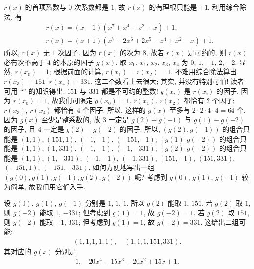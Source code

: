 \begin{example}
    $r(x)$ 的首项系数与 $0$ 次系数都是 $1$, 故 $r(x)$ 的有理根只能是 $\pm 1$. 利用综合除法, 有
    \begin{align*}
         & r(x) = (x-1) (x^7+x^4+x^2+x) + 1,             \\
         & r(x) = (x+1) (x^7-2 x^6+2 x^5-x^4+x^2-x) + 1.
    \end{align*}
    所以, $r(x)$ 无 $1$ 次因子. 因为 $r(x)$ 的次为 $8$, 故若 $r(x)$ 是可约的, 则 $r(x)$ 必有次不高于 $4$ 的本原的因子 $g(x)$. 取 $x_0$, $x_1$, $x_2$, $x_3$, $x_4$ 为 $0$, $1$, $-1$, $2$, $-2$. 显然, $r(x_0) = 1$; 根据前面的计算, $r(x_1) = r(x_2) = 1$. 不难用综合除法算出 $r(x_3) = 151$, $r(x_4) = 331$. 这二个数看上去很大; 其实, 并没有特别可怕! 读者可用 ``\FactorizationOfIntegers '' 的知识得出: $151$ 与 $331$ 都是不可约的整数! $g(x_i)$ 是 $r(x_i)$ 的因子. 因为 $r(x_0) = 1$, 故我们可限定 $g(x_0) = 1$. $r(x_1)$, $r(x_2)$ 都恰有 $2$ 个因子; $r(x_3)$, $r(x_4)$ 都恰有 $4$ 个因子. 所以, 这样的 $g(x)$ 至多有 $2 \cdot 2 \cdot 4 \cdot 4 = 64$ 个. 因为 $g(x)$ 至少是整系数的, 故 $3$ 一定是 $g(2) - g(-1)$ 与 $g(1) - g(-2)$ 的因子, 且 $4$ 一定是 $g(2) - g(-2)$ 的因子. 所以, $(g(2), g(-1))$ 的组合只能是 $(1, 1)$, $(151, 1)$, $(-1, -1)$, $(-151, -1)$; $(g(1), g(-2))$ 的组合只能是 $(1, 1)$, $(1, 331)$, $(-1, -1)$, $(-1, -331)$; $(g(2), g(-2))$ 的组合只能是 $(1, 1)$, $(1, -331)$, $(-1, -1)$, $(-1, 331)$, $(151, -1)$, $(151, 331)$, $(-151, 1)$, $(-151, -331)$. 如何方便地写出一组 $(g(0), g(1), g(-1), g(2), g(-2))$ 呢? 考虑到 $g(0)$, $g(1)$, $g(-1)$ 较为简单, 故我们用它们入手.

    设 $g(0)$, $g(1)$, $g(-1)$ 分别是 $1$, $1$, $1$. 所以 $g(2)$ 能取 $1$, $151$. 若 $g(2)$ 取 $1$, 则 $g(-2)$ 能取 $1$, $-331$; 但考虑到 $g(1) = 1$, 故 $g(-2) = 1$. 若 $g(2)$ 取 $151$, 则 $g(-2)$ 能取 $-1$, $331$; 但考虑到 $g(1) = 1$, 故 $g(-2) = 331$. 这给出二组可能:
    \begin{align*}
        (1,1,1,1,1), \quad (1,1,1,151,331).
    \end{align*}
    其对应的 $g(x)$ 分别是
    \begin{align*}
        1, \quad 20 x^4-15 x^3-20 x^2+15 x+1.
    \end{align*}


\end{example}
